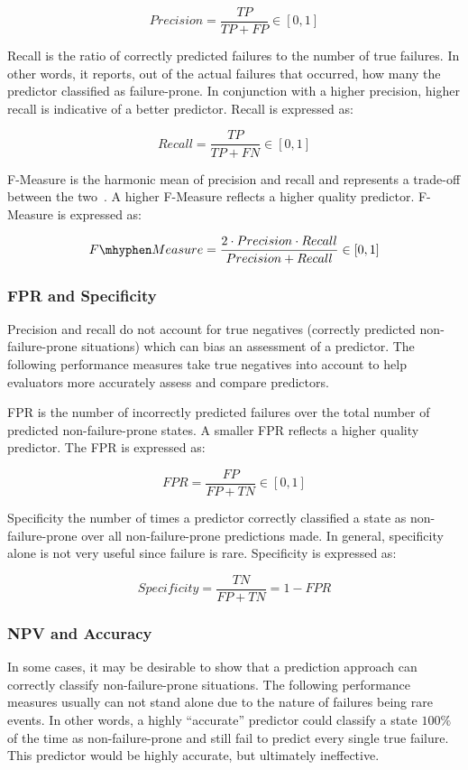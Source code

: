 \[ Precision 
	= \dfrac{TP}{TP + FP} \in [0,1]
\]

Recall is the ratio of correctly predicted failures to the number of true
failures.  In other words, it reports, out of the actual failures that
occurred, how many the predictor classified as failure-prone.  In conjunction
with a higher precision, higher recall is indicative of a better predictor.
Recall is expressed as:

\[ Recall 
	= \dfrac{TP}{TP + FN} \in [0,1]
\]

F-Measure is the harmonic mean of precision and recall and represents a
trade-off between the two~\cite{rijsbergen1979v}.  A higher F-Measure reflects
a higher quality predictor.  F-Measure is expressed as:

\[ F\mhyphen Measure 
	= \dfrac{2 \cdot Precision \cdot Recall}{Precision + Recall} \in [0,1]
\]

\subsubsection{\ac{FPR} and Specificity}
Precision and recall do not account for true negatives (correctly predicted
non-failure-prone situations) which can bias an assessment of a predictor.  The
following performance measures take true negatives into account to help
evaluators more accurately assess and compare predictors.

\ac{FPR} is the number of incorrectly predicted failures over the total number
of predicted non-failure-prone states.  A smaller \ac{FPR} reflects a higher
quality predictor.  The \ac{FPR} is expressed as:

\[ \mathit{FPR}
	= \dfrac{FP}{FP + TN} \in [0,1]
\]

Specificity the number of times a predictor correctly classified a state as
non-failure-prone over all non-failure-prone predictions made.  In general,
specificity alone is not very useful since failure is rare.  Specificity is
expressed as:

\[ Specificity 
	= \dfrac{TN}{FP + TN} = 1 - FPR
\]

\subsubsection{\ac{NPV} and Accuracy}
In some cases, it may be desirable to show that a prediction approach can
correctly classify non-failure-prone situations.  The following performance
measures usually can not stand alone due to the nature of failures being rare
events.  In other words, a highly ``accurate'' predictor could classify a state
$100\%$ of the time as non-failure-prone and still fail to predict every single
true failure.  This predictor would be highly accurate, but ultimately
ineffective.

